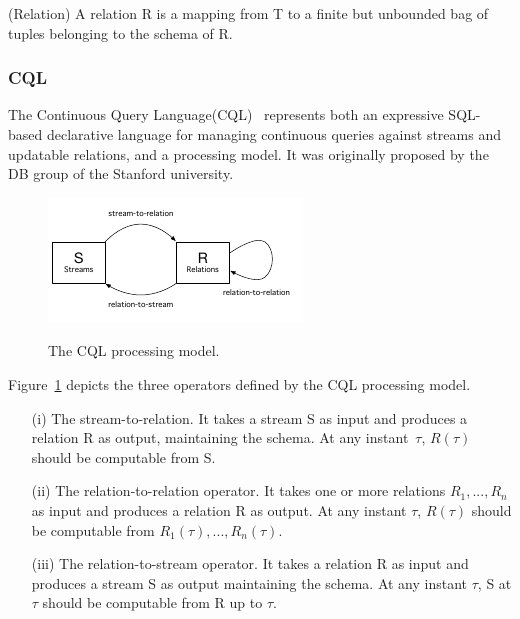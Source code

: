 \begin{Definition}
(Relation) A relation R is a mapping from T to a finite but unbounded bag of tuples belonging to the schema of R.
\end{Definition}
 
\subsubsection{CQL}\label{sec:CQL}
The Continuous Query Language(CQL)~\cite{arasu2006cql} represents both an expressive SQL-based declarative language for managing continuous queries against streams and updatable relations, and a processing model. 
It was originally proposed by the DB group of the Stanford university.

\begin{figure}[h]
  \begin{center}
    \includegraphics[width=.65\textwidth]{img/cql-model}\\
    \caption{The CQL processing model.}
    \label{fig:cql-model}
  \end{center}
\end{figure}

Figure~\ref{fig:cql-model} depicts the three operators defined by the CQL processing model. 
\begin{itemize}
\item[(i)] The stream-to-relation. It takes a stream S as input and produces a relation R as output, maintaining the schema. At any instant~$\tau$, $R(\tau)$ should be computable from S.
\item[(ii)] The relation-to-relation operator. It takes one or more relations $R_1,... , R_n$ as input and produces a relation R as output. At any instant $\tau$, $R(\tau)$ should be computable from $R_1(\tau),... , R_n(\tau)$.
\item[(iii)] The relation-to-stream operator. It takes a relation R as input and produces a stream S as output maintaining the schema. At any instant $\tau$, S at $\tau$ should be computable from R up to $\tau$.
\end{itemize}

